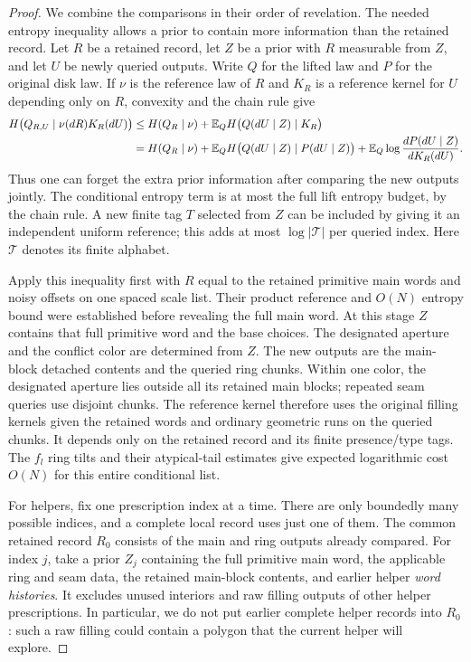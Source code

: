 \begin{proof}
We combine the comparisons in their order of revelation. The needed entropy
inequality allows a prior to contain more information than the retained
record. Let $R$ be a retained record, let $Z$ be a prior with $R$ measurable
from $Z$, and let $U$ be newly queried outputs. Write $Q$ for the lifted law
and $P$ for the original disk law. If $\nu$ is the reference law of $R$ and
$K_R$ is a reference kernel for $U$ depending only on $R$, convexity and the
chain rule give
\begin{align*}
 H\bigl(Q_{R,U}\mid\nu(dR)K_R(dU)\bigr)
 &\le H(Q_R\mid\nu)+\mathbb E_Q H\bigl(Q(dU\mid Z)\mid K_R\bigr)\\
 &=H(Q_R\mid\nu)
  +\mathbb E_Q H\bigl(Q(dU\mid Z)\mid P(dU\mid Z)\bigr)
  +\mathbb E_Q\log\frac{dP(dU\mid Z)}{dK_R(dU)}.
\end{align*}
Thus one can forget the extra prior information after comparing the new
outputs jointly. The conditional entropy term is at most the full lift
entropy budget, by the chain rule. A new finite tag $T$ selected from $Z$
can be included by giving it an independent uniform reference; this adds
at most $\log |\mathcal T|$ per queried index. Here $\mathcal T$ denotes
its finite alphabet.

Apply this inequality first with $R$ equal to the retained primitive main
words and noisy offsets on one spaced scale list. Their product reference
and $O(N)$ entropy bound were established before revealing the full main
word. At this stage $Z$ contains that full primitive word and the base
choices. The designated aperture and the conflict color are determined
from $Z$. The new outputs are the main-block detached contents and the
queried ring chunks. Within one color, the designated aperture lies outside
all its retained main blocks; repeated seam queries use disjoint chunks.
The reference kernel therefore uses the original filling kernels given the
retained words and ordinary geometric runs on the queried chunks. It depends
only on the retained record and its finite presence/type tags. The $f_l$
ring tilts and their atypical-tail estimates give expected logarithmic cost
$O(N)$ for this entire conditional list.

For helpers, fix one prescription index at a time. There are only boundedly
many possible indices, and a complete local record uses just one of them.
The common retained record $R_0$ consists of the main and ring outputs already
compared. For index $j$, take a prior $Z_j$ containing the full primitive main
word, the applicable ring and seam data, the retained main-block contents,
and earlier helper \emph{word histories}. It excludes unused interiors and
raw filling outputs of other helper prescriptions. In particular, we do not
put earlier complete helper records into $R_0$: such a raw filling could
contain a polygon that the current helper will explore.


\end{proof}
